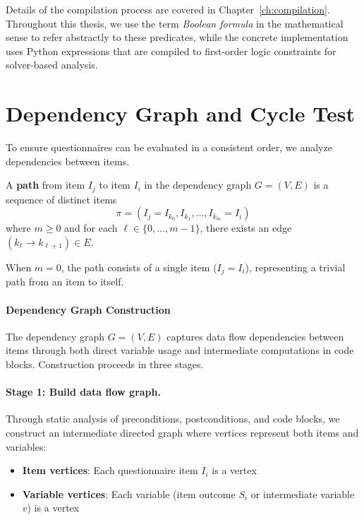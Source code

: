 Details of the compilation process are covered in Chapter~\ref{ch:compilation}. Throughout this thesis, we use the term \emph{Boolean formula} in the mathematical sense to refer abstractly to these predicates, while the concrete implementation uses Python expressions that are compiled to first-order logic constraints for solver-based analysis.

\section{Dependency Graph and Cycle Test}
\label{sec:dep-graph-cycle}

To ensure questionnaires can be evaluated in a consistent order, we analyze dependencies between items.

\begin{definition}
\label{def:path}
A \textbf{path} from item $I_j$ to item $I_i$ in the dependency graph $G = (V, E)$ is a sequence of distinct items
\[
\pi = (I_j = I_{k_0}, I_{k_1}, \dots, I_{k_m} = I_i)
\]
where $m \geq 0$ and for each $\ell \in \{0, \dots, m-1\}$, there exists an edge $(k_\ell \to k_{\ell+1}) \in E$.

When $m = 0$, the path consists of a single item ($I_j = I_i$), representing a trivial path from an item to itself.
\end{definition}

\paragraph{Dependency Graph Construction}

The dependency graph $G = (V, E)$ captures data flow dependencies between items through both direct variable usage and intermediate computations in code blocks. Construction proceeds in three stages.

\paragraph{Stage 1: Build data flow graph.} Through static analysis of preconditions, postconditions, and code blocks, we construct an intermediate directed graph where vertices represent both items and variables:

\begin{itemize}
    \item \textbf{Item vertices}: Each questionnaire item $I_i$ is a vertex
    \item \textbf{Variable vertices}: Each variable (item outcome $S_i$ or intermediate variable $v$) is a vertex
\end{itemize}

